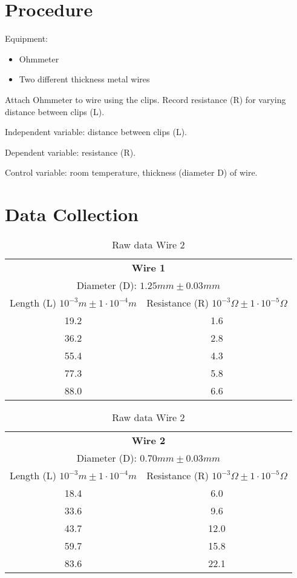 \documentclass[]{article}
\begin{document}
\section{Procedure}
Equipment:
\begin{itemize}
	\item Ohmmeter
	\item Two different thickness metal wires
\end{itemize}

Attach Ohmmeter to wire using the clips. Record resistance (R) for varying distance between clips (L).

Independent variable: distance between clips (L).

Dependent variable: resistance (R).

Control variable: room temperature, thickness (diameter D) of wire.
\section{Data Collection}
\begin{table}[h]
\begin{tabular}{c|c}
	\multicolumn{2}{c}{\textbf{Wire 1}} \\
	\multicolumn{2}{c}{Diameter (D): $1.25mm \pm 0.03mm$} \\
	Length (L) $10^{-3}m \pm 1\cdot10^{-4}m$ & Resistance (R) $  10^{-3} \Omega \pm 1\cdot10^{-5}\Omega$\\
	19.2 & 1.6\\
	36.2 & 2.8\\
	55.4 & 4.3\\
	77.3 & 5.8\\
	88.0 & 6.6\\
\end{tabular}
\caption{Raw data Wire 1}
\vspace{2cm}

\begin{tabular}{c|c}
	\multicolumn{2}{c}{\textbf{Wire 2}} \\
	\multicolumn{2}{c}{Diameter (D): $0.70mm \pm 0.03 mm$}\\	Length (L) $10^{-3}m \pm 1\cdot10^{-4}m$ & Resistance (R) $  10^{-3} \Omega \pm 1\cdot10^{-5} \Omega$\\
	18.4 & 6.0\\
	33.6 & 9.6\\
	43.7 & 12.0\\
	59.7 & 15.8\\
	83.6 & 22.1\\
\end{tabular}
\caption{Raw data Wire 2}
\end{table}
\end{document}
